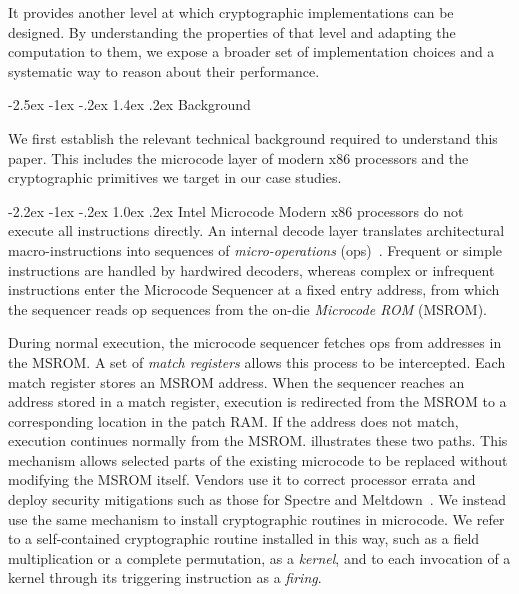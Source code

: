 \documentclass[journal=tches,submission]{iacrtrans}
\makeatletter
\newcommand{\yvali}[1]{\todo[inline,color=darkviolet]{\textcolor{white}{\textbf{Yuval:} #1}}}
\renewcommand\section{\@startsection{section}{1}{\z@}%
      {-2.5ex \@plus -1ex \@minus -.2ex}%
      {1.4ex \@plus .2ex}%
      {\normalfont\Large\bfseries\SS@sectfont}}
\renewcommand\subsection{\@startsection{subsection}{2}{\z@}%
      {-2.2ex \@plus -1ex \@minus -.2ex}%
      {1.0ex \@plus .2ex}%
      {\normalfont\large\bfseries\SS@subsectfont}}
\makeatother
\begin{document}
It provides another level at which cryptographic implementations can be designed. 
By understanding the properties of that level and adapting the computation to them, we expose a broader set of implementation choices and a systematic way to reason about their performance.


\section{Background}
\label{sec:background}

We first establish the relevant technical background required to understand this paper. 
This includes the microcode layer of modern x86 processors and the cryptographic primitives we target in our case studies.

\subsection{Intel Microcode}
\label{sec:background-microcode}
Modern x86 processors do not execute all instructions directly.
An internal decode layer translates architectural macro-instructions into sequences of \emph{micro-operations} (\textmu ops)~\cite{koppeReverseEngineeringX862017}.
Frequent or simple instructions are handled by hardwired decoders, whereas complex or infrequent instructions enter the Microcode Sequencer at a fixed entry address, from which the sequencer reads \textmu op sequences from the on-die \emph{Microcode ROM} (MSROM).

During normal execution, the microcode sequencer fetches \textmu ops from addresses in the MSROM. 
A set of \emph{match registers} allows this process to be intercepted. 
Each match register stores an MSROM address.
When the sequencer reaches an address stored in a match register, execution is redirected from the MSROM to a corresponding location in the patch RAM. 
If the address does not match, execution continues normally from the MSROM. 
 illustrates these two paths.
This mechanism allows selected parts of the existing microcode to be replaced without modifying the MSROM itself. 
Vendors use it to correct processor errata and deploy security mitigations such as those for Spectre and Meltdown~\cite{kocherSpectre2020}. 
We instead use the same mechanism to install cryptographic routines in microcode.
We refer to a self-contained cryptographic routine installed in this way, such as a field multiplication or a complete permutation, as a \emph{kernel}, and to each invocation of a kernel through its triggering instruction as a \emph{firing}.
\end{document}
